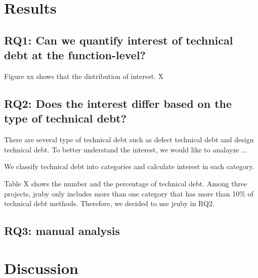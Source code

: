 \documentclass[conference]{IEEEtran}
\begin{document}
\section{Results}
\subsection{RQ1: Can we quantify interest of technical debt at the function-level?}



Figure xx shows that the distribution of interest. X



\subsection{RQ2: Does the interest differ based on the type of technical debt?}
There are several type of technical debt such as defect technical debt and design technical debt. 
To better understand the interest, we would like to analayze ...

We classify technical debt into categories and calculate interest in each category.

Table X shows the number and the percentage of technical debt. Among three projects, jruby only includes more than one category that has more than 10\% of technical debt methods. Therefore, we decided to use jruby in RQ2.



\subsection{RQ3: manual analysis}




\section{Discussion}
\end{document}
